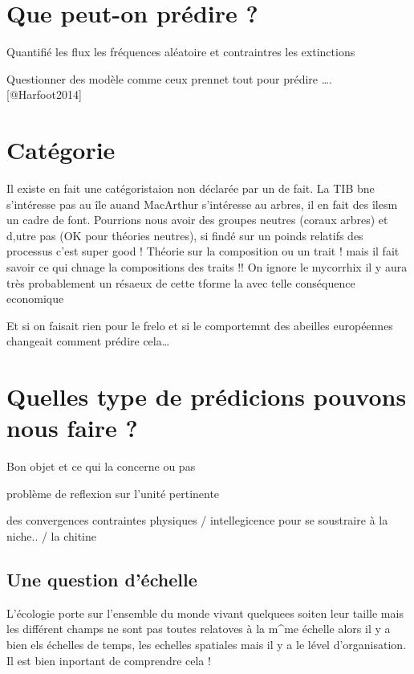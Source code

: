 \section*{Que peut-on prédire ?}\label{que-peut-on-pruxe9dire}

Quantifié les flux les fréquences aléatoire et contraintres les
extinctions

Questionner des modèle comme ceux prennet tout pour prédire \ldots{}.
{[}@Harfoot2014{]}

\section{Catégorie}\label{catuxe9gorie}

Il existe en fait une catégoristaion non déclarée par un de fait. La TIB
bne s'intéresse pas au île auand MacArthur s'intéresse au arbres, il en
fait des îlesm un cadre de font. Pourrions nous avoir des groupes
neutres (coraux arbres) et d,utre pas (OK pour théories neutres), si
findé sur un poinds relatifs des processus c'est super good ! Théorie
sur la composition ou un trait ! mais il fait savoir ce qui chnage la
compositions des traits !! On ignore le mycorrhix il y aura très
probablement un résaeux de cette tforme la avec telle conséquence
economique

Et si on faisait rien pour le frelo et si le comportemnt des abeilles
européennes changeait comment prédire cela\ldots{}

\section{Quelles type de prédicions pouvons nous faire
?}\label{quelles-type-de-pruxe9dicions-pouvons-nous-faire}

Bon objet et ce qui la concerne ou pas

problème de reflexion sur l'unité pertinente

des convergences contraintes physiques / intellegicence pour se
soustraire à la niche.. / la chitine

\subsection{Une question d'échelle}\label{une-question-duxe9chelle}

L'écologie porte sur l'ensemble du monde vivant quelquees soiten leur
taille mais les différent champs ne sont pas toutes relatoves à la
m\^{}me échelle alors il y a bien els échelles de temps, les echelles
spatiales mais il y a le lével d'organisation. Il est bien inportant de
comprendre cela !

